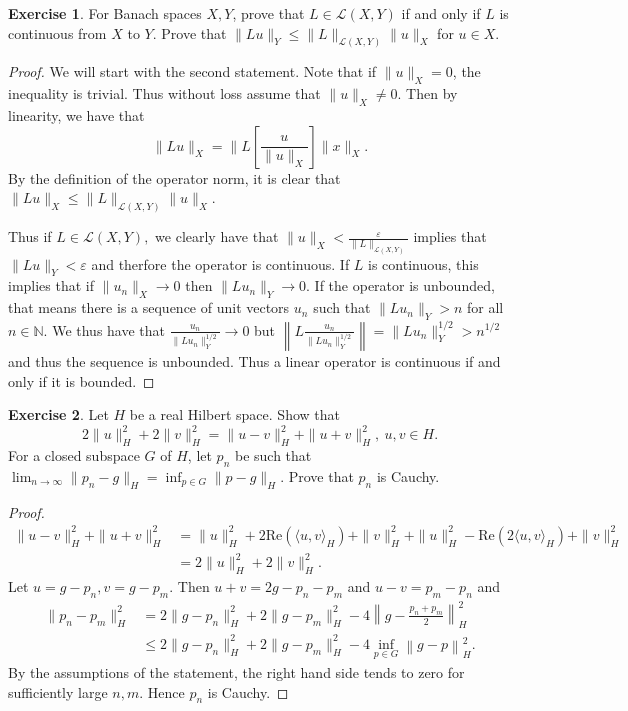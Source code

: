 \documentclass{amsart}
\theoremstyle{plain}
\theoremstyle{definition}
\newtheorem{exer}{Exercise}[section]
\newcommand{\N}{\mathbb{N}}
\begin{document}
\begin{exer}
    For Banach spaces $X,Y$, prove that $L \in \mathcal{L}(X,Y)$ if and only if $L$ is continuous from $X$ to $Y$. Prove that $\|Lu\|_{Y} \leq \|L\|_{\mathcal{L}(X,Y)} \|u\|_{X}$ for $u\in X$.
\end{exer}
\begin{proof}
We will start with the second statement. Note that if $\|u\|_{X} = 0$, the inequality is trivial. Thus without loss assume that $\|u\|_{X} \neq 0$. Then by linearity, we have that $$\|Lu\|_{X} = \|L\left[\frac{u}{\|u\|_{X}}\right]\|x\|_{X}.$$ By the definition of the operator norm, it is clear that $\|Lu\|_{X} \leq \|L\|_{\mathcal{L}\left(X,Y\right)} \|u\|_{X}.$
\par Thus if $L \in \mathcal{L}\left(X,Y\right),$ we clearly have that $\|u\|_{X} < \frac{\varepsilon}{\|L\|_{\mathcal{L}\left(X,Y\right)}}$ implies that $\|Lu\|_{Y} < \varepsilon$ and therfore the operator is continuous. If $L$ is continuous, this implies that if $\|u_n\|_{X} \to 0$ then $\|Lu_n\|_{Y} \to 0.$ If the operator is unbounded, that means there is a sequence of unit vectors $u_n$ such that $\|Lu_n\|_Y > n$ for all $n\in \N.$ We thus have that $\frac{u_n}{\|Lu_n\|_{Y}^{1/2}}\to 0$ but $\left\|L\frac{u_n}{\|Lu_n\|_{Y}^{1/2}}\right\| = \|Lu_n\|_{Y}^{1/2} > n^{1/2}$ and thus the sequence is unbounded. Thus a linear operator is continuous if and only if it is bounded. 
\end{proof}

\begin{exer}
    Let $H$ be a real Hilbert space. Show that 
    $$2\|u\|_{H}^2 + 2 \|v\|_{H}^2 = \|u-v\|_{H}^2 + \|u+v\|_{H}^2, \ u,v\in H.$$
    For a closed subspace $G$ of $H$, let $p_n$ be such that $\lim_{n\to \infty }\|p_n-g\|_{H} = \inf_{p\in G} \|p-g\|_{H}.$ Prove that $p_n$ is Cauchy.
\end{exer}
\begin{proof}
    \begin{align*}
        \|u-v\|_{H}^2 + \|u+v\|_{H}^2 & = \|u\|^2_{H}+ 2\text{Re}\left(\langle u, v\rangle_{H}\right) + \|v\|_{H}^2 + \|u\|^2_{H}- \text{Re}\left(2\langle u, v\rangle_{H}\right) + \|v\|_{H}^2\\
        &= 2\|u\|_{H}^2 + 2\|v\|_{H}^2.
    \end{align*}
    Let $u = g-p_n, v= g-p_m$. Then $u+v = 2g-p_n-p_m$ and $u-v = p_m - p_n$ and 
    \begin{align*}
        \|p_n - p_m\|_{H}^2 &= 2 \|g-p_n\|_{H}^2 + 2 \|g-p_m\|_{H}^2 - 4\left\|g-\frac{p_n+p_m}{2}\right\|_{H}^2\\
        & \leq 2 \|g-p_n\|_{H}^2 + 2 \|g-p_m\|_{H}^2 - 4\inf_{p\in G}\left\|g-p\right\|_{H}^2.
    \end{align*}
    By the assumptions of the statement, the right hand side tends to zero for sufficiently large $n,m$. Hence $p_n$ is Cauchy.
\end{proof}
\end{document}
